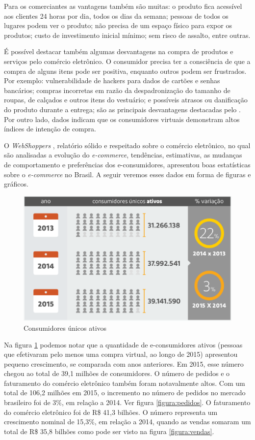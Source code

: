 \documentclass[a4paper,12pt]{monografia}
\begin{document}
Para os comerciantes as vantagens também são muitas: o produto fica acessível aos clientes 24 horas por dia, todos os dias da semana; pessoas de todos os lugares podem ver o produto; não precisa de um espaço físico para expor os produtos; custo de investimento inicial mínimo; sem risco de assalto, entre outras.

É possível destacar também algumas desvantagens na compra de produtos e serviços pelo comércio eletrônico. O consumidor precisa ter a consciência de que a compra de alguns itens pode ser positiva, enquanto outros podem ser frustrados. Por exemplo: vulnerabilidade de hackers para dados de cartões e senhas bancários; compras incorretas em razão da despadronização do tamanho de roupas, de calçados e outros itens do vestuário; e possíveis atrasos ou danificação do produto durante a entrega; são as principais desvantagens destacadas pelo . Por outro lado, dados indicam que os consumidores virtuais demonstram altos índices de intenção de compra.

O \textit{WebShoppers} , relatório sólido e respeitado sobre o comércio eletrônico, no qual são analisadas a evolução do \textit{e-commerce}, tendências, estimativas, as mudanças de comportamento e preferências dos e-consumidores, apresentou boas estatísticas sobre o \textit{e-commerce} no Brasil. A seguir veremos esses dados em forma de figuras e gráficos.

\begin{figure}[H]
\centering
\includegraphics[width=15cm]{img/webshoppers/consumidores.eps}
\caption{Consumidores únicos ativos}
\label{figura:consumidores}
\end{figure}

Na figura \ref{figura:consumidores} podemos notar que a quantidade de e-consumidores ativos (pessoas que efetivaram pelo
menos uma compra virtual, ao longo de 2015) apresentou pequeno crescimento, se comparada com anos anteriores. Em 2015, esse número chegou ao total de 39,1 milhões de consumidores. O número de pedidos e o faturamento do comércio eletrônico também foram notavalmente altos. Com um total de 106,2 milhões em 2015, o incremento no número de pedidos no mercado brasileiro foi de 3\%,
em relação a 2014. Ver figura \ref{figura:pedidos}. O faturamento do comércio eletrônico foi de R\$ 41,3 bilhões. O número representa um crescimento nominal de 15,3\%, em relação a 2014, quando as vendas somaram um total de R\$ 35,8 bilhões como pode ser visto na figura \ref{figura:vendas}.
\end{document}
